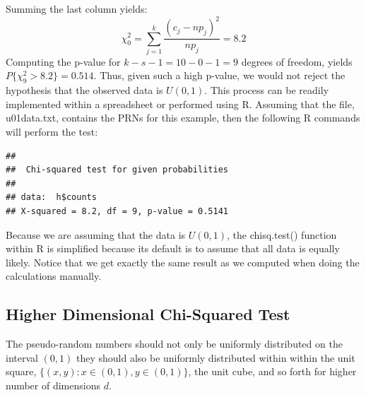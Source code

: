 \documentclass[
]{book}
\newenvironment{Shaded}{\begin{snugshade}}{\end{snugshade}}
\newcommand{\AttributeTok}[1]{\textcolor[rgb]{0.77,0.63,0.00}{#1}}
\newcommand{\CommentTok}[1]{\textcolor[rgb]{0.56,0.35,0.01}{\textit{#1}}}
\newcommand{\ConstantTok}[1]{\textcolor[rgb]{0.00,0.00,0.00}{#1}}
\newcommand{\DecValTok}[1]{\textcolor[rgb]{0.00,0.00,0.81}{#1}}
\newcommand{\FloatTok}[1]{\textcolor[rgb]{0.00,0.00,0.81}{#1}}
\newcommand{\FunctionTok}[1]{\textcolor[rgb]{0.00,0.00,0.00}{#1}}
\newcommand{\NormalTok}[1]{#1}
\newcommand{\OtherTok}[1]{\textcolor[rgb]{0.56,0.35,0.01}{#1}}
\newcommand{\SpecialCharTok}[1]{\textcolor[rgb]{0.00,0.00,0.00}{#1}}
\newcommand{\StringTok}[1]{\textcolor[rgb]{0.31,0.60,0.02}{#1}}
\theoremstyle{definition}
\theoremstyle{definition}
\theoremstyle{definition}
\theoremstyle{definition}
\theoremstyle{remark}
\begin{document}
\hfill\break

Summing the last column yields:
\[\chi^{2}_{0} = \sum\limits_{j=1}^{k} \frac{\left( c_{j} - np_{j} \right)^{2}}{np_{j}} = 8.2\]
Computing the p-value for \(k-s-1=10-0-1=9\) degrees of freedom, yields
\(P\{\chi^{2}_{9} > 8.2\} = 0.514\). Thus, given such a high p-value, we
would not reject the hypothesis that the observed data is \(U(0,1)\). This process can be readily implemented within a spreadsheet or performed using R. Assuming that the file, u01data.txt, contains the PRNs for this example, then the following R commands will
perform the test:\\

\begin{Shaded}
\end{Shaded}

\begin{verbatim}
## 
##  Chi-squared test for given probabilities
## 
## data:  h$counts
## X-squared = 8.2, df = 9, p-value = 0.5141
\end{verbatim}

Because we are assuming that the data is \(U(0,1)\), the chisq.test() function within R is simplified because its default is to assume that all data is equally likely. Notice that we get exactly the same result as we computed when doing the calculations manually.

\hypertarget{higher-dimensional-chi-squared-test}{%
\subsection{Higher Dimensional Chi-Squared Test}\label{higher-dimensional-chi-squared-test}}

The pseudo-random numbers should not only be uniformly distributed on
the interval \((0,1)\) they should also be uniformly distributed within
within the unit square,
\(\lbrace (x,y): x\in (0,1), y \in (0,1) \rbrace\), the unit cube, and so
forth for higher number of dimensions \(d\).
\end{document}
